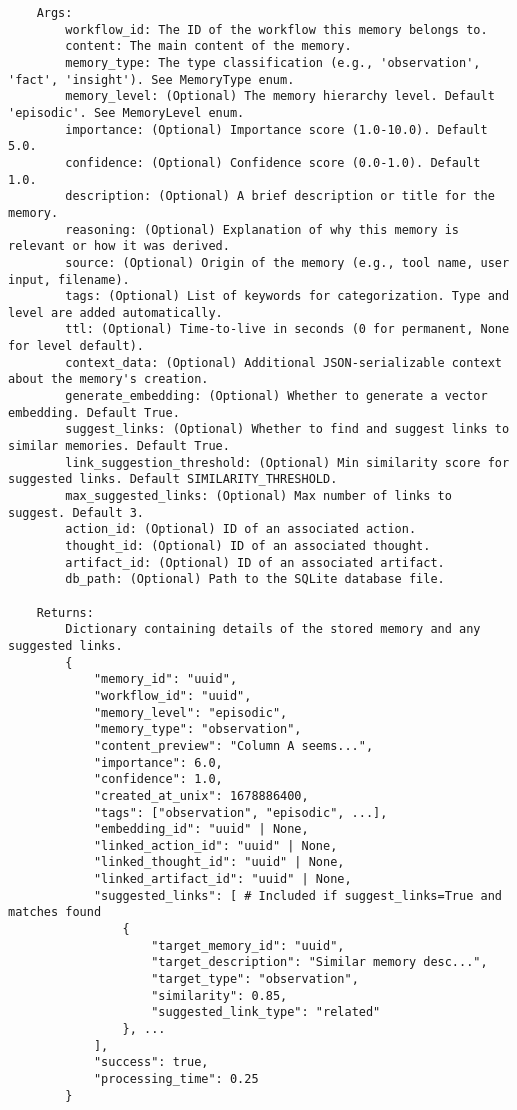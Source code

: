 \documentclass[12pt,a4paper]{article}
\begin{document}
\begin{pageablecode}
\begin{verbatim}
    Args:
        workflow_id: The ID of the workflow this memory belongs to.
        content: The main content of the memory.
        memory_type: The type classification (e.g., 'observation', 'fact', 'insight'). See MemoryType enum.
        memory_level: (Optional) The memory hierarchy level. Default 'episodic'. See MemoryLevel enum.
        importance: (Optional) Importance score (1.0-10.0). Default 5.0.
        confidence: (Optional) Confidence score (0.0-1.0). Default 1.0.
        description: (Optional) A brief description or title for the memory.
        reasoning: (Optional) Explanation of why this memory is relevant or how it was derived.
        source: (Optional) Origin of the memory (e.g., tool name, user input, filename).
        tags: (Optional) List of keywords for categorization. Type and level are added automatically.
        ttl: (Optional) Time-to-live in seconds (0 for permanent, None for level default).
        context_data: (Optional) Additional JSON-serializable context about the memory's creation.
        generate_embedding: (Optional) Whether to generate a vector embedding. Default True.
        suggest_links: (Optional) Whether to find and suggest links to similar memories. Default True.
        link_suggestion_threshold: (Optional) Min similarity score for suggested links. Default SIMILARITY_THRESHOLD.
        max_suggested_links: (Optional) Max number of links to suggest. Default 3.
        action_id: (Optional) ID of an associated action.
        thought_id: (Optional) ID of an associated thought.
        artifact_id: (Optional) ID of an associated artifact.
        db_path: (Optional) Path to the SQLite database file.

    Returns:
        Dictionary containing details of the stored memory and any suggested links.
        {
            "memory_id": "uuid",
            "workflow_id": "uuid",
            "memory_level": "episodic",
            "memory_type": "observation",
            "content_preview": "Column A seems...",
            "importance": 6.0,
            "confidence": 1.0,
            "created_at_unix": 1678886400,
            "tags": ["observation", "episodic", ...],
            "embedding_id": "uuid" | None,
            "linked_action_id": "uuid" | None,
            "linked_thought_id": "uuid" | None,
            "linked_artifact_id": "uuid" | None,
            "suggested_links": [ # Included if suggest_links=True and matches found
                {
                    "target_memory_id": "uuid",
                    "target_description": "Similar memory desc...",
                    "target_type": "observation",
                    "similarity": 0.85,
                    "suggested_link_type": "related"
                }, ...
            ],
            "success": true,
            "processing_time": 0.25
        }


\end{verbatim}
\end{pageablecode}
\end{document}
